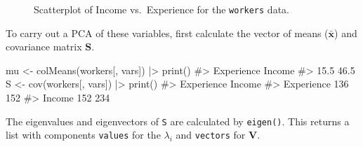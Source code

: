 \documentclass[
  letterpaper,
  10pt,
  krantz2]{krantz}
\makeatletter
\newenvironment{Shaded}{\begin{snugshade}}{\end{snugshade}}
\newcommand{\CommentTok}[1]{\textcolor[rgb]{0.37,0.37,0.37}{#1}}
\newcommand{\FunctionTok}[1]{\textcolor[rgb]{0.28,0.35,0.67}{#1}}
\newcommand{\NormalTok}[1]{\textcolor[rgb]{0.00,0.23,0.31}{#1}}
\newcommand{\OtherTok}[1]{\textcolor[rgb]{0.00,0.23,0.31}{#1}}
\newcommand{\SpecialCharTok}[1]{\textcolor[rgb]{0.37,0.37,0.37}{#1}}
\newenvironment{kframe}{%
  \medskip{}
  \setlength{\fboxsep}{.8em}
  \def\at@end@of@kframe{}%
  \ifinner\ifhmode%
  \def\at@end@of@kframe{\end{minipage}}%
  \begin{minipage}{\columnwidth}%
  \fi\fi%
  \def\FrameCommand##1{\hskip\@totalleftmargin \hskip-\fboxsep
  \colorbox{shadecolor}{##1}\hskip-\fboxsep
      \hskip-\linewidth \hskip-\@totalleftmargin \hskip\columnwidth}%
  \MakeFramed {\advance\hsize-\width
    \@totalleftmargin\z@ \linewidth\hsize
    \@setminipage}}%
{\par\unskip\endMakeFramed%
  \at@end@of@kframe}
\renewenvironment{Shaded}{\begin{kframe}}{\end{kframe}}
\makeatother
\begin{document}
\begin{figure}[H]


\caption{\label{fig-workers-scat}Scatterplot of Income vs.~Experience
for the \texttt{workers} data.}

\end{figure}%

To carry out a PCA of these variables, first calculate the vector of
means (\(\bar{\mathbf{x}}\)) and covariance matrix \(\mathbf{S}\).

\begin{Shaded}
\begin{Highlighting}[]
\NormalTok{mu }\OtherTok{\textless{}{-}} \FunctionTok{colMeans}\NormalTok{(workers[, vars]) }\SpecialCharTok{|\textgreater{}} \FunctionTok{print}\NormalTok{()}
\CommentTok{\#\textgreater{} Experience     Income }
\CommentTok{\#\textgreater{}       15.5       46.5}
\NormalTok{S }\OtherTok{\textless{}{-}} \FunctionTok{cov}\NormalTok{(workers[, vars]) }\SpecialCharTok{|\textgreater{}} \FunctionTok{print}\NormalTok{()}
\CommentTok{\#\textgreater{}            Experience Income}
\CommentTok{\#\textgreater{} Experience        136    152}
\CommentTok{\#\textgreater{} Income            152    234}
\end{Highlighting}
\end{Shaded}

The eigenvalues and eigenvectors of \texttt{S} are calculated by
\texttt{eigen()}. This returns a list with components \texttt{values}
for the \(\lambda_i\) and \texttt{vectors} for \(\mathbf{V}\).
\end{document}
